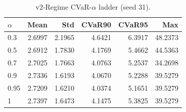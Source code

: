 \begin{table}[H]
    \centering
    \caption{v2-Regime CVaR-$\alpha$ ladder (seed 31).}
    \label{tab:v2_regime_alpha}
    \begin{tabular}{@{}lrrrrr@{}}
        \toprule
        $\alpha$ & Mean & Std & CVaR90 & CVaR95 & Max \\
        \midrule
        0.3 & 2.6997 & 2.1965 & 4.6421 & 6.3917 & 48.2373 \\
        0.5 & 2.6912 & 1.7830 & 4.1769 & 5.4662 & 44.5363 \\
        0.7 & 2.7025 & 1.7663 & 4.0763 & 5.2537 & 34.2698 \\
        0.9 & 2.7336 & 1.6193 & 4.0670 & 5.2288 & 39.5279 \\
        0.95 & 2.7209 & 1.6210 & 4.0374 & 5.1651 & 39.5279 \\
        1 & 2.7397 & 1.6473 & 4.1475 & 5.3825 & 39.5279 \\
        \bottomrule
    \end{tabular}
\end{table}
